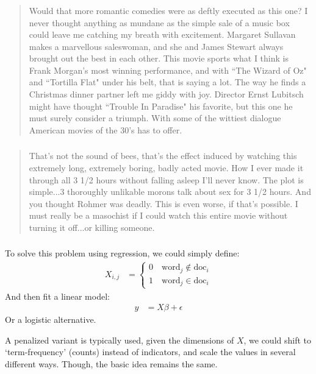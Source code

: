 \documentclass[xetex,mathserif,serif,aspectratio=169]{beamer}
\begin{document}
\begin{frame}[fragile] \frametitle{} \oldB

\begin{quote}
Would that more romantic comedies were as deftly executed as this one? I never thought anything as mundane as the simple sale of a music box could leave me catching my breath with excitement. Margaret Sullavan makes a marvellous saleswoman, and she and James Stewart always brought out the best in each other. This movie sports what I think is Frank Morgan's most winning performance, and with ``The Wizard of Oz" and ``Tortilla Flat" under his belt, that is saying a lot. The way he finds a Christmas dinner partner left me giddy with joy. Director Ernst Lubitsch might have thought ``Trouble In Paradise" his favorite, but this one he must surely consider a triumph. With some of the wittiest dialogue American movies of the 30's has to offer.
\end{quote}

\end{frame}

\begin{frame}[fragile] \frametitle{} \oldB

\begin{quote}
That's not the sound of bees, that's the effect induced by watching this extremely long, extremely boring, badly acted movie. How I ever made it through all 3 1/2 hours without falling asleep I'll never know. The plot is simple...3 thoroughly unlikable morons talk about sex for 3 1/2 hours. And you thought Rohmer was deadly. This is even worse, if that's possible. I must really be a masochist if I could watch this entire movie without turning it off...or killing someone.
\end{quote}

\end{frame}

\begin{frame}[fragile] \frametitle{} \oldB \small


To solve this problem using regression, we could simply
define:
\begin{align*}
X_{i,j} &= \left\{  \begin{array}{l} 0 \quad \text{word}_j \notin \text{doc}_i \\
                                     1 \quad \text{word}_j \in \text{doc}_i
                    \end{array} \right.
\end{align*}
And then fit a linear model:
\begin{align*}
y &= X \beta + \epsilon
\end{align*}
Or a logistic alternative.

\pause A penalized variant is typically used, given the dimensions of $X$,
we could shift to `term-frequency' (counts) instead of indicators, and scale
the values in several different ways. Though, the basic idea remains the same.

\end{frame}
\end{document}
